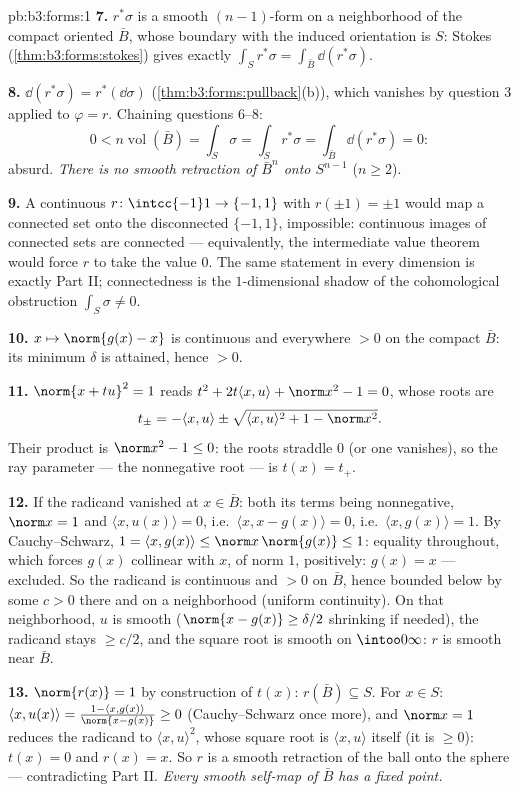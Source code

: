 \begin{solution}{pb:b3:forms:1}
\textbf{7.} $r^*\sigma$ is a smooth $(n-1)$-form on a
neighborhood of the compact oriented $\bar B$, whose
boundary with the induced orientation is $S$: Stokes
(\cref{thm:b3:forms:stokes}) gives exactly
$\int_Sr^*\sigma = \int_{\bar B}\dd(r^*\sigma)$.

\textbf{8.} $\dd(r^*\sigma) = r^*(\dd\sigma)$
(\cref{thm:b3:forms:pullback}(b)), which vanishes by
question 3 applied to $\varphi = r$. Chaining questions
6--8:
\[
0 < n\operatorname{vol}(\bar B) = \int_S\sigma =
\int_Sr^*\sigma = \int_{\bar B}\dd(r^*\sigma) = 0 :
\]
absurd. \emph{There is no smooth retraction of $\bar B^n$
onto $S^{n-1}$} ($n \geq 2$).

\textbf{9.} A continuous $r\colon\intcc{-1}1\to\{-1,1\}$
with $r(\pm1) = \pm1$ would map a connected set onto the
disconnected $\{-1, 1\}$, impossible: continuous images of
connected sets are connected --- equivalently, the
intermediate value theorem would force $r$ to take the value
$0$. The same statement in every dimension is exactly Part
II; connectedness is the $1$-dimensional shadow of the
cohomological obstruction $\int_S\sigma \neq 0$.

\textbf{10.} $x \mapsto \norm{g(x) - x}$ is continuous and
everywhere $> 0$ on the compact $\bar B$: its minimum
$\delta$ is attained, hence $> 0$.

\textbf{11.} $\norm{x + tu}^2 = 1$ reads $t^2 + 2t\langle x,
u\rangle + \norm x^2 - 1 = 0$, whose roots are
\[
t_\pm = -\langle x, u\rangle \pm \sqrt{\langle x,
u\rangle^2 + 1 - \norm x^2} .
\]
Their product is $\norm x^2 - 1 \leq 0$: the roots straddle
$0$ (or one vanishes), so the ray parameter --- the
nonnegative root --- is $t(x) = t_+$.

\textbf{12.} If the radicand vanished at $x \in \bar B$:
both its terms being nonnegative, $\norm x = 1$ and
$\langle x, u(x)\rangle = 0$, i.e.\ $\langle x, x -
g(x)\rangle = 0$, i.e.\ $\langle x, g(x)\rangle = 1$. By
Cauchy--Schwarz, $1 = \langle x, g(x)\rangle \leq
\norm x\,\norm{g(x)} \leq 1$: equality throughout, which
forces $g(x)$ collinear with $x$, of norm $1$, positively:
$g(x) = x$ --- excluded. So the radicand is continuous and
$> 0$ on $\bar B$, hence bounded below by some $c > 0$
there and on a neighborhood (uniform continuity). On that
neighborhood, $u$ is smooth ($\norm{x - g(x)} \geq
\delta/2$ shrinking if needed), the radicand stays $\geq
c/2$, and the square root is smooth on $\intoo0\infty$: $r$
is smooth near $\bar B$.

\textbf{13.} $\norm{r(x)} = 1$ by construction of $t(x)$:
$r(\bar B) \subseteq S$. For $x \in S$: $\langle x,
u(x)\rangle = \frac{1 - \langle x, g(x)\rangle}{\norm{x -
g(x)}} \geq 0$ (Cauchy--Schwarz once more), and $\norm x =
1$ reduces the radicand to $\langle x, u\rangle^2$, whose
square root is $\langle x, u\rangle$ itself (it is $\geq
0$): $t(x) = 0$ and $r(x) = x$. So $r$ is a smooth
retraction of the ball onto the sphere --- contradicting
Part II. \emph{Every smooth self-map of $\bar B$ has a
fixed point.}


\end{solution}
